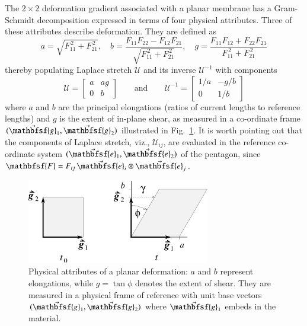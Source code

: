 The $2 \times 2$ deformation gradient associated with a planar membrane has a Gram-Schmidt decomposition expressed in terms of four physical attributes.  Three of these attributes describe deformation.  They are defined as \cite{Freedetal17}
\begin{equation}
a = \sqrt{F_{11}^{\,2} + F_{21}^{\,2}} , \quad
b = \frac{F_{11} F_{22} - F_{12} F_{21}}
{\sqrt{F_{11}^{\,2} + F_{21}^{\,2}}} , \quad
g = \frac{F_{11} F_{12} +  F_{22} F_{21}}
{F_{11}^{\,2} + F_{21}^{\,2}} 
\label{physicalVariables}
\end{equation}
thereby populating Laplace stretch $\boldsymbol{\mathcal{U}}$ and its inverse $\boldsymbol{\mathcal{U}}^{-1}$ with components
\begin{equation}
\boldsymbol{\mathcal{U}} = \begin{bmatrix}
a & a g \\ 0 & b
\end{bmatrix} \qquad \text{and} \qquad
\boldsymbol{\mathcal{U}}^{-1} = \begin{bmatrix} 
1 / a & -g / b \\ 0 & 1 / b
\end{bmatrix}
\label{LaplaceStretch2D}
\end{equation}
where $a$ and $b$ are the principal elongations (ratios of current lengths to reference lengths) and $g$ is the extent of in-plane shear, as measured in a co-ordinate frame $(  \vec{\mathbfsf{g}}_1 , \vec{\mathbfsf{g}}_2 )$ illustrated in Fig.~\ref{figKinematics}.  It is worth pointing out that the components of Laplace stretch, viz., $\mathcal{U}_{ij}$, are evaluated in the reference co-ordinate system $( \vec{\mathbfsf{e}}_1 , \vec{\mathbfsf{e}}_2 )$ of the pentagon, since $\mathbfsf{F} = F_{ij} \, \vec{\mathbfsf{e}}_i \otimes \vec{\mathbfsf{e}}_j$.

\begin{figure}
	\centering
	\includegraphics[width=8cm]{figures/deformation.pdf}
	\caption{Physical attributes of a planar deformation: $a$ and $b$ represent elongations, while $g = \tan \phi$ denotes the extent of shear.  They are measured in a physical frame of reference with unit base vectors $( \vec{\mathbfsf{g}}_1 , \vec{\mathbfsf{g}}_2 )$ where $\vec{\mathbfsf{g}}_1$ embeds in the material.}
	\label{figKinematics}
\end{figure}

